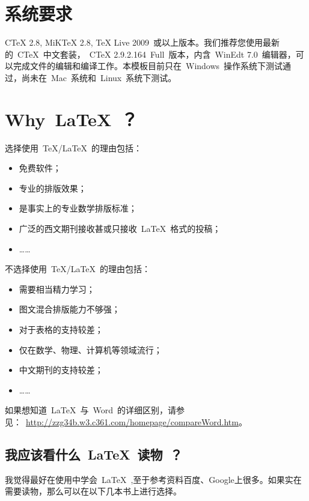 \section{系统要求}

     CTeX 2.8, MiKTeX 2.8, TeX Live 2009~或以上版本。我们推荐您使用最新的~CTeX~中文套装，~CTeX 2.9.2.164~Full~版本，内含~WinEdt 7.0~编辑器，可以完成文件的编辑和编译工作。本模板目前只在~Windows~操作系统下测试通过，尚未在~Mac~系统和~Linux~系统下测试。

\section{Why~\LaTeX~？}

选择使用~\TeX/\LaTeX~的理由包括：
\begin{itemize}
\item 免费软件；
\item 专业的排版效果；
\item 是事实上的专业数学排版标准；
\item 广泛的西文期刊接收甚或只接收~\LaTeX~格式的投稿；
\item[] ……
\end{itemize}
不选择使用~\TeX/\LaTeX~的理由包括：
\begin{itemize}
\item 需要相当精力学习；
\item 图文混合排版能力不够强；
\item 对于表格的支持较差；
\item 仅在数学、物理、计算机等领域流行；
\item 中文期刊的支持较差；
\item[] ……
\end{itemize}

如果想知道~\LaTeX~与~Word~的详细区别，请参见：~\url{http://zzg34b.w3.c361.com/homepage/compareWord.htm}。

\subsection{我应该看什么~\LaTeX~读物~？}

我觉得最好在使用中学会~\LaTeX~,至于参考资料百度、Google上很多。如果实在需要读物，那么可以在以下几本书上进行选择。

